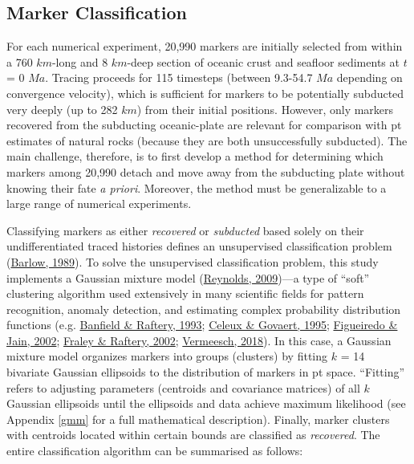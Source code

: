 \hypertarget{marker-classification}{%
\subsection{Marker Classification}\label{marker-classification}}

For each numerical experiment, 20,990 markers are initially selected from within a 760 \(km\)-long and 8 \(km\)-deep section of oceanic crust and seafloor sediments at \(t\) = 0 \(Ma\). Tracing proceeds for 115 timesteps (between 9.3-54.7 \(Ma\) depending on convergence velocity), which is sufficient for markers to be potentially subducted very deeply (up to 282 \(km\)) from their initial positions. However, only markers recovered from the subducting oceanic-plate are relevant for comparison with \gls{pt} estimates of natural rocks (because they are both unsuccessfully subducted). The main challenge, therefore, is to first develop a method for determining which markers among 20,990 detach and move away from the subducting plate without knowing their fate \emph{a priori}. Moreover, the method must be generalizable to a large range of numerical experiments.

Classifying markers as either \emph{recovered} or \emph{subducted} based solely on their undifferentiated traced histories defines an unsupervised classification problem (\protect\hyperlink{ref-barlow1989}{Barlow, 1989}). To solve the unsupervised classification problem, this study implements a Gaussian mixture model (\protect\hyperlink{ref-reynolds2009}{Reynolds, 2009})---a type of ``soft'' clustering algorithm used extensively in many scientific fields for pattern recognition, anomaly detection, and estimating complex probability distribution functions (e.g. \protect\hyperlink{ref-banfield1993}{Banfield \& Raftery, 1993}; \protect\hyperlink{ref-celeux1995}{Celeux \& Govaert, 1995}; \protect\hyperlink{ref-figueiredo2002}{Figueiredo \& Jain, 2002}; \protect\hyperlink{ref-fraley2002}{Fraley \& Raftery, 2002}; \protect\hyperlink{ref-vermeesch2018}{Vermeesch, 2018}). In this case, a Gaussian mixture model organizes markers into groups (clusters) by fitting \(k\) = 14 bivariate Gaussian ellipsoids to the distribution of markers in \gls{pt} space. ``Fitting'' refers to adjusting parameters (centroids and covariance matrices) of all \(k\) Gaussian ellipsoids until the ellipsoids and data achieve maximum likelihood (see Appendix \ref{gmm} for a full mathematical description). Finally, marker clusters with centroids located within certain bounds are classified as \emph{recovered}. The entire classification algorithm can be summarised as follows:

